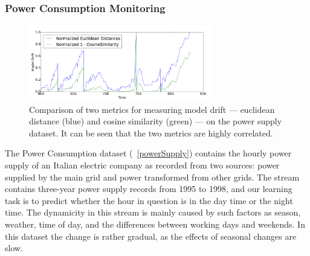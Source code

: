 %
%
\subsubsection{Power Consumption Monitoring}
\begin{figure}
	\centering
	\includegraphics[width=8cm]{graphics/CosineVsEuclideanPowerSupply.png}
	\caption{Comparison of two metrics for measuring model drift --- euclidean distance (blue) and cosine similarity (green) --- on the power supply dataset. It can be seen that the two metrics are highly correlated.}
	
	\label{PERvsDLDAonPowerSupply}
	\end{figure}
	
	
The Power Consumption dataset  (~\ref{powerSupply}) contains the hourly power supply of an
Italian electric company as recorded from two sources: power supplied
by the main grid and power transformed from other grids.
The stream contains three-year power supply records
from 1995 to 1998, and our learning task is to predict whether the hour 
in question is in the day time or the night time.
The dynamicity in this stream is mainly caused by such factors as season, weather, time of day,
and the differences between working days and weekends.
In this dataset the change is rather gradual, as the effects of
seasonal changes are slow.

